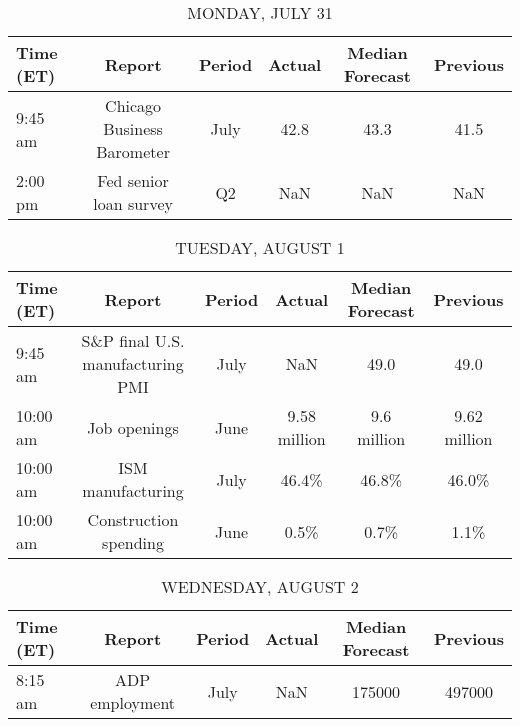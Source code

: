 \documentclass{article}%
\begin{document}
%
\normalsize%


\begin{table}[htbp]%
\caption{MONDAY, JULY 31}%
\centering%
\begin{adjustbox}{width=1\textwidth}%
\begin{tabular}{lccccc}
\toprule
Time (ET) &                     Report & Period & Actual & Median Forecast & Previous \\
\midrule
  9:45 am & Chicago Business Barometer &   July &   42.8 &            43.3 &     41.5 \\
  2:00 pm &     Fed senior loan survey &     Q2 &    NaN &             NaN &      NaN \\
\bottomrule
\end{tabular}
%
\end{adjustbox}%
\end{table}

%


\begin{table}[htbp]%
\caption{TUESDAY, AUGUST 1}%
\centering%
\begin{adjustbox}{width=1\textwidth}%
\begin{tabular}{lccccc}
\toprule
Time (ET) &                           Report & Period &       Actual & Median Forecast &     Previous \\
\midrule
  9:45 am & S\&P final U.S. manufacturing PMI &   July &          NaN &            49.0 &         49.0 \\
 10:00 am &                     Job openings &   June & 9.58 million &     9.6 million & 9.62 million \\
 10:00 am &                ISM manufacturing &   July &        46.4\% &           46.8\% &        46.0\% \\
 10:00 am &            Construction spending &   June &         0.5\% &            0.7\% &         1.1\% \\
\bottomrule
\end{tabular}
%
\end{adjustbox}%
\end{table}

%


\begin{table}[htbp]%
\caption{WEDNESDAY, AUGUST 2}%
\centering%
\begin{adjustbox}{width=1\textwidth}%
\begin{tabular}{lccccc}
\toprule
Time (ET) &         Report & Period & Actual & Median Forecast & Previous \\
\midrule
  8:15 am & ADP employment &   July &    NaN &          175000 &   497000 \\
\bottomrule
\end{tabular}
%
\end{adjustbox}%
\end{table}
\end{document}
